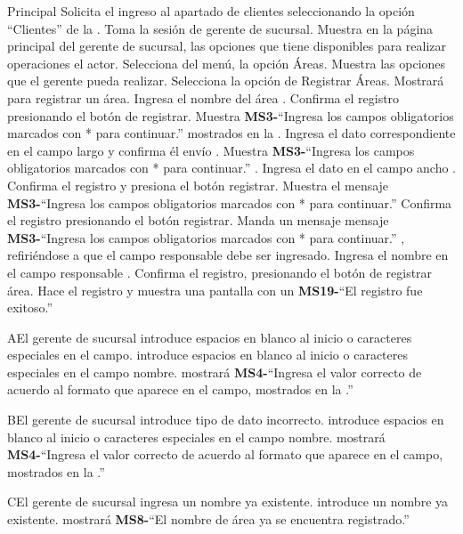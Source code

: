 	\begin{UCtrayectoria}{Principal}
		\UCpaso[\UCactor] Solicita el ingreso al apartado de clientes seleccionando la opción ``Clientes'' de la .
		\UCpaso Toma la sesión de gerente de sucursal.
		\UCpaso Muestra en la página principal del gerente de sucursal, las opciones que tiene disponibles para realizar operaciones el actor. 
		\UCpaso[\UCactor] Selecciona del menú, la opción Áreas.
		\UCpaso Muestra las opciones que el gerente pueda realizar.
		\UCpaso[\UCactor] Selecciona la opción de Registrar Áreas.
		\UCpaso Mostrará   para registrar un área.
		\UCpaso[\UCactor] Ingresa el nombre del área  .
		\UCpaso[\UCactor] Confirma el registro presionando el botón de registrar.
		\UCpaso Muestra {\bf MS3-}``Ingresa los campos obligatorios marcados con * para continuar.''  mostrados en la  .
		\UCpaso[\UCactor] Ingresa el dato correspondiente en el campo largo y confirma él envío .
		\UCpaso Muestra {\bf MS3-}``Ingresa los campos obligatorios marcados con * para continuar.'' .
		\UCpaso[\UCactor] Ingresa el dato en el campo ancho .
		\UCpaso[\UCactor] Confirma el registro y presiona el botón registrar.
		\UCpaso Muestra el mensaje {\bf MS3-}``Ingresa los campos obligatorios marcados con * para continuar.''
		\UCpaso[\UCactor] Confirma el registro presionando el botón registrar.
		\UCpaso Manda un mensaje mensaje {\bf MS3-}``Ingresa los campos obligatorios marcados con * para continuar.'' , refiriéndose a  que el campo responsable debe ser ingresado.
		\UCpaso[\UCactor] Ingresa el nombre en el campo responsable .
		\UCpaso[\UCactor] Confirma el registro, presionando el botón de registrar área.
		\UCpaso Hace el registro y muestra una pantalla con un {\bf MS19-}``El registro fue exitoso.''
	\end{UCtrayectoria}
		
		\begin{UCtrayectoriaA}{A}{El gerente de sucursal introduce espacios en blanco al inicio o caracteres especiales en el campo.}
			\UCpaso[\UCactor] introduce espacios en blanco al inicio o caracteres especiales en el campo nombre.
			\UCpaso mostrará {\bf MS4-}``Ingresa el valor correcto de acuerdo al formato que aparece en el campo, mostrados en la .''
		\end{UCtrayectoriaA}

		\begin{UCtrayectoriaA}{B}{El gerente de sucursal introduce tipo de dato incorrecto.}
			\UCpaso[\UCactor] introduce espacios en blanco al inicio o caracteres especiales en el campo nombre.
			\UCpaso mostrará {\bf MS4-}``Ingresa el valor correcto de acuerdo al formato que aparece en el campo, mostrados en la .''
		\end{UCtrayectoriaA}

		\begin{UCtrayectoriaA}{C}{El gerente de sucursal ingresa un nombre ya existente.}
			\UCpaso[\UCactor] introduce un nombre ya existente.
			\UCpaso mostrará {\bf MS8-}``El nombre de área ya se encuentra registrado.''
		\end{UCtrayectoriaA}
